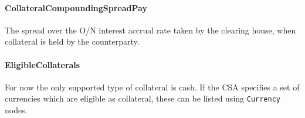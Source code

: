 \paragraph{CollateralCompoundingSpreadPay} The spread over the O/N
interest accrual rate taken by the clearing house, when collateral is
held by the counterparty.

\paragraph{EligibleCollaterals} For now the only supported type of
collateral is cash. If the CSA specifies a set of currencies which
are eligible as collateral, these can be listed using
\lstinline!Currency! nodes.

